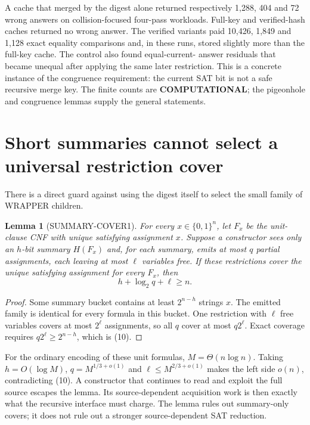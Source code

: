 \documentclass[11pt]{article}
\newtheorem{lemma}[theorem]{Lemma}
\begin{document}
A cache that merged by the digest alone returned respectively 1,288, 404 and
72 wrong answers on collision-focused four-pass workloads.  Full-key and
verified-hash caches returned no wrong answer.  The verified variants paid
10,426, 1,849 and 1,128 exact equality comparisons and, in these runs, stored
slightly more than the full-key cache.  The control also found equal-current-
answer residuals that became unequal after applying the same later
restriction.  This is a concrete instance of the congruence requirement:
the current SAT bit is not a safe recursive merge key.  The finite counts are
\textbf{COMPUTATIONAL}; the pigeonhole and congruence lemmas supply the
general statements.

\section{Short summaries cannot select a universal restriction cover}
There is a direct guard against using the digest itself to select the small
family of WRAPPER children.

\begin{lemma}[SUMMARY-COVER1]
For every $x\in\{0,1\}^n$, let $F_x$ be the unit-clause CNF with unique
satisfying assignment $x$.  Suppose a constructor sees only an $h$-bit
summary $H(F_x)$ and, for each summary, emits at most $q$ partial assignments,
each leaving at most $\ell$ variables free.  If these restrictions cover the
unique satisfying assignment for every $F_x$, then
\[
 \boxed{h+\log_2q+\ell\ge n.}
\tag{10}
\]
\end{lemma}
\begin{proof}
Some summary bucket contains at least $2^{n-h}$ strings $x$.  The emitted
family is identical for every formula in this bucket.  One restriction with
$\ell$ free variables covers at most $2^\ell$ assignments, so all $q$ cover
at most $q2^\ell$.  Exact coverage requires
$q2^\ell\ge2^{n-h}$, which is (10).
\end{proof}

For the ordinary encoding of these unit formulas, $M=\Theta(n\log n)$.
Taking $h=O(\log M)$, $q=M^{1/3+o(1)}$ and
$\ell\le M^{2/3+o(1)}$ makes the left side $o(n)$, contradicting (10).
A constructor that continues to read and exploit the full source escapes the
lemma.  Its source-dependent acquisition work is then exactly what the
recursive interface must charge.  The lemma rules out summary-only covers;
it does not rule out a stronger source-dependent SAT reduction.
\end{document}
